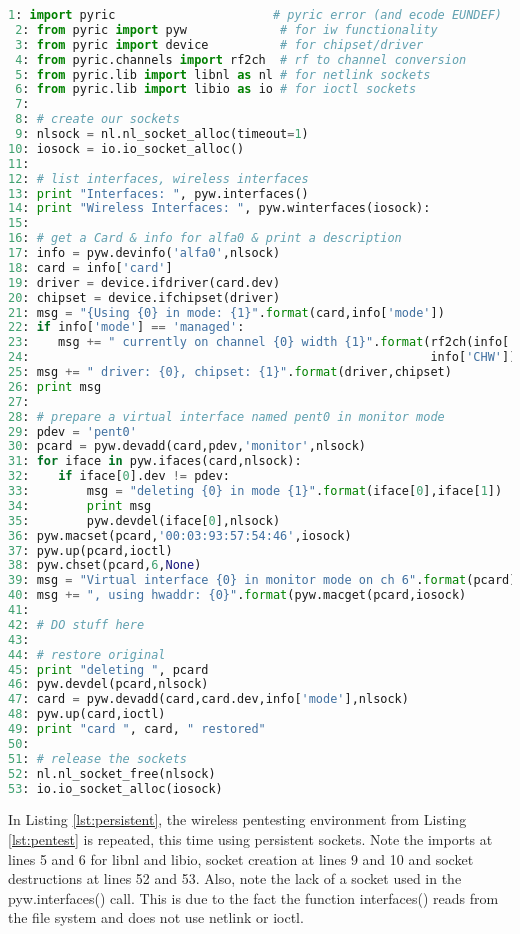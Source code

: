\documentclass[11pt]{article}
\begin{document}
\begin{lstlisting}[caption={Using Persistent Sockets},
                   label={lst:persistent},
                   language=Python]
 1: import pyric                      # pyric error (and ecode EUNDEF)
 2: from pyric import pyw             # for iw functionality
 3: from pyric import device          # for chipset/driver
 4: from pyric.channels import rf2ch  # rf to channel conversion
 5: from pyric.lib import libnl as nl # for netlink sockets
 6: from pyric.lib import libio as io # for ioctl sockets 
 7:
 8: # create our sockets 
 9: nlsock = nl.nl_socket_alloc(timeout=1)
10: iosock = io.io_socket_alloc()
11:
12: # list interfaces, wireless interfaces
13: print "Interfaces: ", pyw.interfaces()
14: print "Wireless Interfaces: ", pyw.winterfaces(iosock):
15:
16: # get a Card & info for alfa0 & print a description
17: info = pyw.devinfo('alfa0',nlsock) 
18: card = info['card']
19: driver = device.ifdriver(card.dev)
20: chipset = device.ifchipset(driver)
21: msg = "{Using {0} in mode: {1}".format(card,info['mode'])
22: if info['mode'] == 'managed':
23:    msg += " currently on channel {0} width {1}".format(rf2ch(info['RF']),
24:                                                        info['CHW'])
25: msg += " driver: {0}, chipset: {1}".format(driver,chipset)
26: print msg
27:
28: # prepare a virtual interface named pent0 in monitor mode
29: pdev = 'pent0'
30: pcard = pyw.devadd(card,pdev,'monitor',nlsock)
31: for iface in pyw.ifaces(card,nlsock):
32:    if iface[0].dev != pdev:
33:        msg = "deleting {0} in mode {1}".format(iface[0],iface[1])
34:        print msg
35:        pyw.devdel(iface[0],nlsock)
36: pyw.macset(pcard,'00:03:93:57:54:46',iosock)
37: pyw.up(pcard,ioctl)
38: pyw.chset(pcard,6,None)
39: msg = "Virtual interface {0} in monitor mode on ch 6".format(pcard)
40: msg += ", using hwaddr: {0}".format(pyw.macget(pcard,iosock)
41: 
42: # DO stuff here
43:
44: # restore original
45: print "deleting ", pcard
46: pyw.devdel(pcard,nlsock)
47: card = pyw.devadd(card,card.dev,info['mode'],nlsock)
48: pyw.up(card,ioctl)
49: print "card ", card, " restored"   
50:
51: # release the sockets
52: nl.nl_socket_free(nlsock)
53: io.io_socket_alloc(iosock)
\end{lstlisting}

In Listing \ref{lst:persistent}, the wireless pentesting environment from Listing 
\ref{lst:pentest} is repeated, this time using persistent sockets. Note the imports 
at lines 5 and 6 for libnl and libio, socket creation at lines 9 and 10 and socket
destructions at lines 52 and 53. Also, note the lack of a socket used in the 
pyw.interfaces() call. This is due to the fact the function interfaces() reads
from the file system and does not use netlink or ioctl. \\
\end{document}
